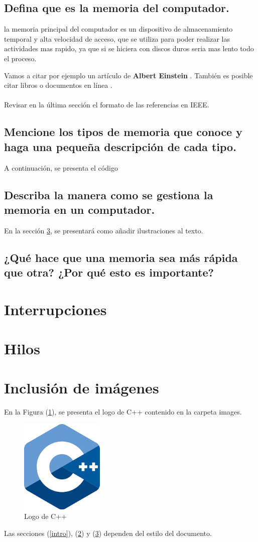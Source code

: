 \documentclass{article}
\begin{document}
\subsection{Defina que es la memoria del computador.}
la memoria principal del computador es un dispositivo de almacenamiento temporal y alta velocidad de acceso, que se utiliza para poder realizar las actividades mas rapido, ya que si se hiciera con discos duros seria mas lento todo el proceso.

Vamos a citar por ejemplo un artículo de \textbf{Albert Einstein} \cite{einstein}.
También es posible citar libros \cite{dirac} o documentos en línea \cite{knuthwebsite}.\\\\
Revisar en la última sección el formato de las referencias en IEEE.

\subsection{Mencione los tipos de memoria que conoce y haga una pequeña descripción de cada tipo.}
%
A continuación, se presenta el código 
\subsection{Describa la manera como se gestiona la memoria en un computador.}
En la sección \ref{imagenes}, se presentará como añadir ilustraciones al texto.
\subsection{¿Qué hace que una memoria sea más rápida que otra? ¿Por qué esto es importante?}
\newpage
\section{Interrupciones} \label{contenido}
\newpage
\section{Hilos} \label{contenido}
\newpage
\section{Inclusión de imágenes} \label{imagenes}


En la Figura (\ref{fig:cpplogo}), se presenta el logo de C++ contenido en la carpeta images.

\begin{figure}[h]
\includegraphics[width=4cm]{cpplogo.png}
\centering
\caption{Logo de C++}
\label{fig:cpplogo}
\end{figure}

Las secciones (\ref{intro}), (\ref{contenido}) y (\ref{imagenes}) dependen del estilo del documento.



\end{document}
